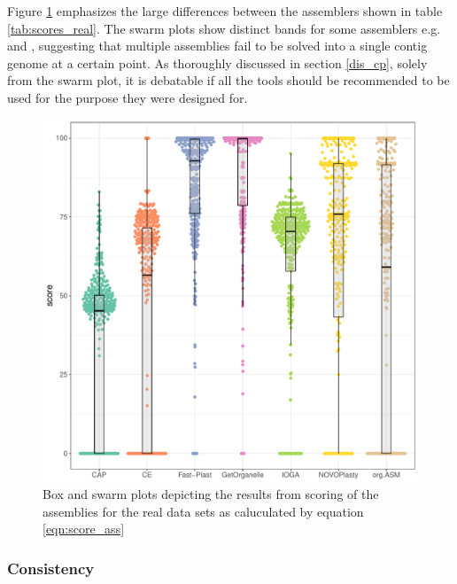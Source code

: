 Figure \ref{fig:swarm} emphasizes the large differences between the assemblers shown in
table \ref{tab:scores_real}. The swarm plots show distinct bands for some assemblers
e.g. \np \hspace{0.25ex} and \oa, suggesting that multiple assemblies fail to be solved
into a single contig genome at a certain point. As thoroughly discussed in section
\ref{dis_cp}, solely from the swarm plot, it is debatable if all the tools should be
recommended to be used for the purpose they were designed for.

\begin{figure}[H]
\centering
\includegraphics[height=.5\textheight, width=.99\textwidth]{Figures/swarm}
\decoRule
\caption[Scores of assemblies from real data sets]{Box and swarm plots depicting the
  results from scoring of the assemblies for the real data sets as caluculated by equation
  \ref{eqn:score_ass}}
\label{fig:swarm}
\end{figure}

\subsubsection{Consistency}

